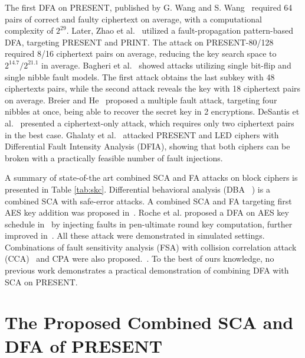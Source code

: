 \documentclass[10pt, conference, compsocconf]{IEEEtran}  %
\numberwithin{Definition}{section}
\numberwithin{Claim}{section}
\begin{document}
The first DFA on PRESENT, published by G. Wang and S. Wang~\cite{present_dfa1} required 64 pairs of correct and faulty ciphertext on average, with a computational complexity of $2^{29}$. Later, Zhao et al.~\cite{present_dfa2} utilized a fault-propagation pattern-based DFA, targeting PRESENT and PRINT. The attack on PRESENT-80/128 required 8/16 ciphertext pairs on average, reducing the key search space to $2^{14.7}/2^{21.1}$ in average. Bagheri et al.~\cite{present_dfa3} showed attacks utilizing single bit-flip and single nibble fault models. The first attack obtains the last subkey with 48 ciphertexts pairs, while the second attack reveals the key with 18 ciphertext pairs on average. Breier and He~\cite{siot2015} proposed a multiple fault attack, targeting four nibbles at once, being able to recover the secret key in 2 encryptions.
DeSantis et al.~\cite{DeSantis2015} presented a ciphertext-only attack, which requires only two ciphertext pairs in the best case. Ghalaty et al.~\cite{Ghalaty2015} attacked PRESENT and LED ciphers with Differential Fault Intensity Analysis (DFIA), showing that both ciphers can be broken with a practically feasible number of fault injections. 

A summary of state-of-the art combined SCA and FA attacks on block ciphers is presented in Table \ref{tab:skc}.
Differential behavioral analysis (DBA ~\cite{robisson2007differential}) is a combined SCA with safe-error attacks.
A combined SCA and FA targeting first AES key addition was proposed in~\cite{clavier2010passive}.
Roche et al. proposed a DFA on AES key schedule in~\cite{roche2011combined} by injecting faults in pen-ultimate round key computation, further improved in~\cite{dassance2012combined}.
All these attack were demonstrated in simulated settings.
Combinations of fault sensitivity analysis (FSA) with collision correlation attack (CCA)~\cite{moradi2011power} and CPA were also proposed.~\cite{li2013exploring}.
To the best of ours knowledge, no previous work demonstrates a practical demonstration of combining DFA with SCA on PRESENT.

\section{The Proposed Combined SCA and DFA of PRESENT}
\end{document}
